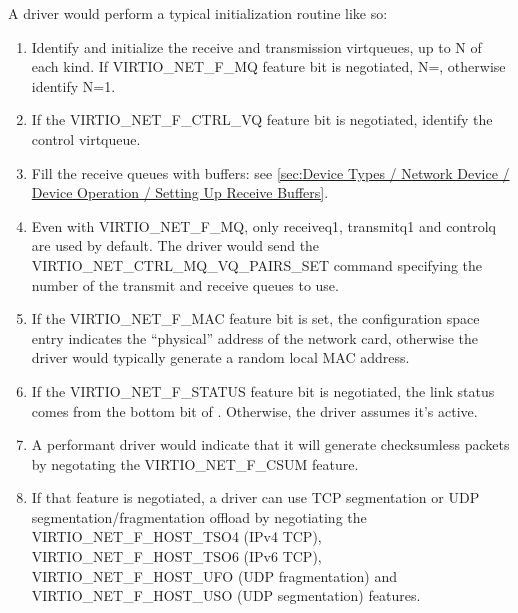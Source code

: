 A driver would perform a typical initialization routine like so:

\begin{enumerate}
\item Identify and initialize the receive and
  transmission virtqueues, up to N of each kind. If
  VIRTIO_NET_F_MQ feature bit is negotiated,
  N=, otherwise identify N=1.

\item If the VIRTIO_NET_F_CTRL_VQ feature bit is negotiated,
  identify the control virtqueue.

\item Fill the receive queues with buffers: see \ref{sec:Device Types / Network Device / Device Operation / Setting Up Receive Buffers}.

\item Even with VIRTIO_NET_F_MQ, only receiveq1, transmitq1 and
  controlq are used by default.  The driver would send the
  VIRTIO_NET_CTRL_MQ_VQ_PAIRS_SET command specifying the
  number of the transmit and receive queues to use.

\item If the VIRTIO_NET_F_MAC feature bit is set, the configuration
  space  entry indicates the ``physical'' address of the
  network card, otherwise the driver would typically generate a random
  local MAC address.

\item If the VIRTIO_NET_F_STATUS feature bit is negotiated, the link
  status comes from the bottom bit of .
  Otherwise, the driver assumes it's active.

\item A performant driver would indicate that it will generate checksumless
  packets by negotating the VIRTIO_NET_F_CSUM feature.

\item If that feature is negotiated, a driver can use TCP segmentation or UDP
  segmentation/fragmentation offload by negotiating the VIRTIO_NET_F_HOST_TSO4 (IPv4
  TCP), VIRTIO_NET_F_HOST_TSO6 (IPv6 TCP), VIRTIO_NET_F_HOST_UFO
  (UDP fragmentation) and VIRTIO_NET_F_HOST_USO (UDP segmentation) features.


\end{enumerate}
